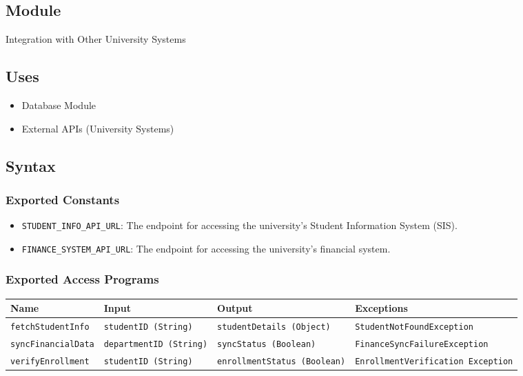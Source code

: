 \documentclass[12pt, titlepage]{article}
\begin{document}
\subsection{Module}
Integration with Other University Systems

\subsection{Uses}
\begin{itemize}
    \item Database Module
    \item External APIs (University Systems)
\end{itemize}

\subsection{Syntax}

\subsubsection{Exported Constants}
\begin{itemize}
    \item \texttt{STUDENT\_INFO\_API\_URL}: The endpoint for accessing the university’s Student Information System (SIS).
    \item \texttt{FINANCE\_SYSTEM\_API\_URL}: The endpoint for accessing the university’s financial system.
\end{itemize}

\subsubsection{Exported Access Programs}
\begin{center}
    \scriptsize
    \begin{tabular}{|p{3cm}|p{4cm}|p{4cm}|p{4cm}|}
        \hline
        \textbf{Name} & \textbf{Input} & \textbf{Output} & \textbf{Exceptions} \\
        \hline
        \texttt{fetchStudentInfo} & \texttt{studentID (String)} & \texttt{studentDetails (Object)} & \texttt{StudentNotFoundException} \\
        \hline
        \texttt{syncFinancialData} & \texttt{departmentID (String)} & \texttt{syncStatus (Boolean)} & \texttt{FinanceSyncFailureException} \\
        \hline
        \texttt{verifyEnrollment} & \texttt{studentID (String)} & \texttt{enrollmentStatus (Boolean)} & \texttt{EnrollmentVerification \newline Exception} \\
        \hline
    \end{tabular}
\end{center}
\end{document}
